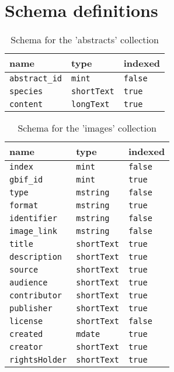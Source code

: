 \appendix
\section{Schema definitions}\label{sec:schema-definitions}

\begin{table}[H]
  \caption{Schema for the 'abstracts' collection}
  \label{tab:abstracts-schema}
  \begin{tabular}{lll}
    \toprule
    name&type&indexed\\
    \midrule
    \texttt{abstract\_id} & \texttt{mint} & \texttt{false} \\
    \texttt{species}&\texttt{shortText}&\texttt{true}\\
    \texttt{content}&\texttt{longText}&\texttt{true}\\
  \bottomrule
\end{tabular}
\end{table}

\begin{table}[H]
  \caption{Schema for the 'images' collection}
  \label{tab:images-schema}
  \begin{tabular}{lll}
    \toprule
    name & type & indexed \\
    \midrule
    \texttt{index} & \texttt{mint} & \texttt{false} \\
    \texttt{gbif\_id} & \texttt{mint} & \texttt{true} \\
    \texttt{type} & \texttt{mstring} & \texttt{false} \\
    \texttt{format} & \texttt{mstring} & \texttt{true} \\
    \texttt{identifier} & \texttt{mstring} & \texttt{false} \\
    \texttt{image\_link} & \texttt{mstring} & \texttt{false} \\
    \texttt{title} & \texttt{shortText} & \texttt{true} \\
    \texttt{description} & \texttt{shortText} & \texttt{true} \\
    \texttt{source} & \texttt{shortText} & \texttt{true} \\
    \texttt{audience} & \texttt{shortText} & \texttt{true} \\
    \texttt{contributor} & \texttt{shortText} & \texttt{true} \\
    \texttt{publisher} & \texttt{shortText} & \texttt{true} \\
    \texttt{license} & \texttt{shortText} & \texttt{false} \\
    \texttt{created} & \texttt{mdate} & \texttt{true} \\
    \texttt{creator} & \texttt{shortText} & \texttt{true} \\
    \texttt{rightsHolder} & \texttt{shortText} & \texttt{true} \\
    \bottomrule
  \end{tabular}
\end{table}

